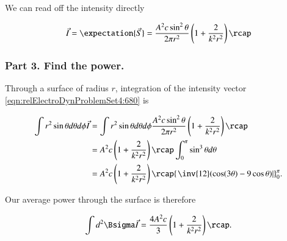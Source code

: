 We can read off the intensity directly

\begin{equation}\label{eqn:relElectroDynProblemSet4:680}
\vec{I} = \expectation{\vec{S}} = 
\frac{A^2 c \sin^2 \theta}{2 \pi r^2} 
\left( 1 + \frac{2}{k^2 r^2} \right) \rcap 
\end{equation}

\subsubsection{Part 3.  Find the power.}

Through a surface of radius $r$, integration of the intensity vector \ref{eqn:relElectroDynProblemSet4:680} is

\begin{align*}
\int 
r^2 \sin\theta d\theta d\phi
\vec{I} 
&= 
\int r^2 \sin\theta d\theta d\phi 
\frac{A^2 c \sin^2 \theta}{2 \pi r^2} 
\left( 1 + \frac{2}{k^2 r^2} \right) \rcap \\
&= 
A^2 c 
\left( 1 + \frac{2}{k^2 r^2} \right) \rcap 
\int_0^\pi \sin^3\theta d\theta \\
&= 
A^2 c 
\left( 1 + \frac{2}{k^2 r^2} \right) \rcap 
{\left.\inv{12}( \cos(3\theta) - 9 \cos\theta )\right\vert}_0^\pi.
\end{align*}

Our average power through the surface is therefore

\begin{equation}\label{eqn:relElectroDynProblemSet4:690}
\int d^2 \Bsigma \vec{I} =
\frac{4 A^2 c }{3}
\left( 1 + \frac{2}{k^2 r^2} \right) \rcap.
\end{equation}

